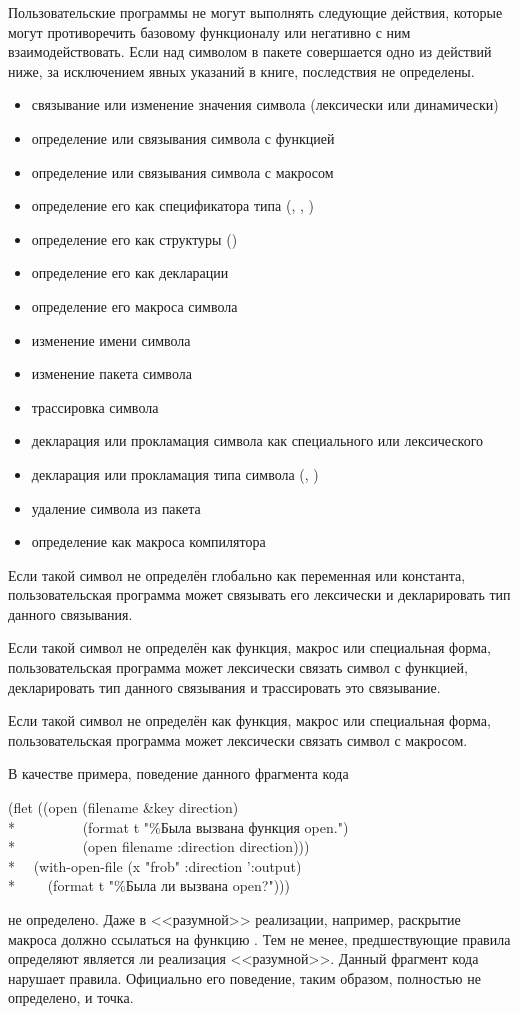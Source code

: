 Пользовательские программы не могут выполнять следующие действия, которые
могут противоречить базовому функционалу или негативно с ним взаимодействовать.
Если над символом в пакете  совершается одно из действий ниже,
за исключением явных указаний в книге, последствия не определены.
\begin{itemize}
\item связывание или изменение значения символа (лексически или динамически)
\item определение или связывания символа с функцией
\item определение или связывания символа с макросом
\item определение его как спецификатора типа (, , )
\item определение его как структуры ()
\item определение его как декларации
\item определение его макроса символа
\item изменение имени символа
\item изменение пакета символа
\item трассировка символа
\item декларация или прокламация символа как специального или лексического
\item декларация или прокламация типа символа (, )
\item удаление символа из пакета 
\item определение как макроса компилятора
\end{itemize}

Если такой символ не определён глобально как переменная или константа,
пользовательская программа может связывать его лексически и декларировать тип
 данного связывания.

Если такой символ не определён как функция, макрос или специальная форма,
пользовательская программа может лексически связать символ с функцией,
декларировать тип  данного связывания и трассировать это связывание. 

Если такой символ не определён как функция, макрос или специальная форма,
пользовательская программа может лексически связать символ с макросом.

В качестве примера, поведение данного фрагмента кода
\begin{lisp}
(flet ((open (filename \&key direction) \\*
~~~~~~~~~(format t "{\Xtilde}\%Была вызвана функция open.")  \\*
~~~~~~~~~(open filename :direction direction))) \\*
~~(with-open-file (x "frob" :direction ':output)  \\*
~~~~(format t "{\Xtilde}\%Была ли вызвана open?")))
\end{lisp}
не определено. Даже в <<разумной>> реализации, например, раскрытие макроса
 должно ссылаться на функцию . Тем не менее,
предшествующие правила определяют является ли реализация <<разумной>>.
Данный фрагмент кода нарушает правила. Официально его поведение, таким образом,
полностью не определено, и точка.

